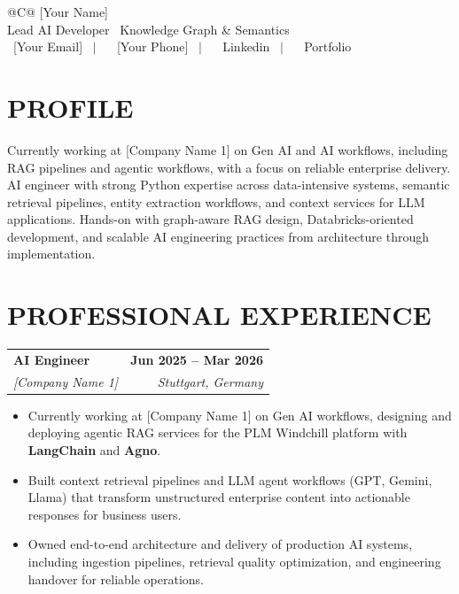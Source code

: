 \documentclass[a4paper,11pt]{article}
\makeatletter
\newcommand{\entryheader}[4]{%
  \begin{tabularx}{\textwidth}{@{}>{\RaggedRight\arraybackslash}X r@{}}
    \textbf{#1} & \textbf{#2} \\
    \textit{#3} & \textit{#4} \\
  \end{tabularx}%
}
\newenvironment{entrybullets}{%
  \begin{minipage}[t]{0.77\textwidth}
    \begin{itemize}[leftmargin=*,label=\textbullet,align=left]
}{%
    \end{itemize}
  \end{minipage}
}
\newcommand{\safehref}[2]{#2}
\let\href\safehref
\makeatother
\begin{document}
\pagestyle{empty}

\begin{tabularx}{\linewidth}{@{}C@{}}
  \Huge{[Your Name]}\\[10pt]
  
  \large{Lead AI Developer \textbar\ Knowledge Graph \& Semantics}\\[3pt]


  \href{mailto: [Your Email]}{\raisebox{-0.05\height}{\faEnvelope} \ [Your Email]} \ $|$ \
  \href{tel:[Your Phone]}{ \ [Your Phone]} \ $|$ \
  \href{[Your LinkedIn URL]}{\raisebox{-0.05\height}{\faLinkedin} \ Linkedin} \ $|$ \
  \href{[Your Portfolio URL]}{\raisebox{-0.05\height}{\faLink} \ Portfolio}\\
\end{tabularx}

\section*{PROFILE}
Currently working at [Company Name 1] on Gen AI and AI workflows, including RAG pipelines and agentic workflows, with a focus on reliable enterprise delivery. AI engineer with strong Python expertise across data-intensive systems, semantic retrieval pipelines, entity extraction workflows, and context services for LLM applications. Hands-on with graph-aware RAG design, Databricks-oriented development, and scalable AI engineering practices from architecture through implementation.


\section*{PROFESSIONAL EXPERIENCE}
\entryheader{AI Engineer}{Jun 2025 -- Mar 2026}{[Company Name 1]}{Stuttgart, Germany}
\begin{entrybullets}
  \item Currently working at [Company Name 1] on Gen AI workflows, designing and deploying agentic RAG services for the PLM Windchill platform with \textbf{LangChain} and \textbf{Agno}.
  \item Built context retrieval pipelines and LLM agent workflows (GPT, Gemini, Llama) that transform unstructured enterprise content into actionable responses for business users.
  \item Owned end-to-end architecture and delivery of production AI systems, including ingestion pipelines, retrieval quality optimization, and engineering handover for reliable operations.
\end{entrybullets}
\end{document}
